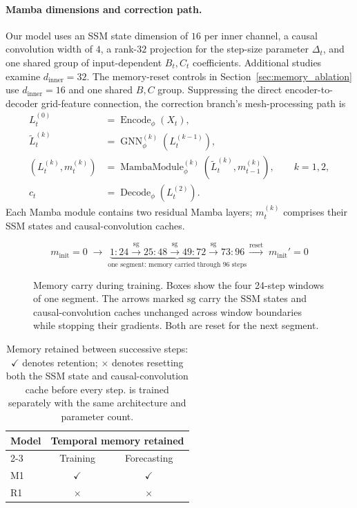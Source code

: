 \documentclass{article}
\newcommand{\vfourchange}[1]{{\color{blue}#1}}
\newcommand{\vfourred}[1]{{\color{red}#1}}
\newif\ifvfivechanges
\newcommand{\vfiveidentity}[1]{#1}
\DeclareRobustCommand{\vfiveadded}[1]{\ifvfivechanges{\color{vfiveAdded}%
  \let\vfourchange\vfiveidentity\let\vfourred\vfiveidentity#1}\else{\color{blue}%
  \let\vfourchange\vfiveidentity\let\vfourred\vfiveidentity#1}\fi}
\DeclareRobustCommand{\vfiveRone}[1]{\ifvfivechanges{\color{vfiveDeleted}\sout{#1}}\,\fi\vfiveadded{R1}}
\begin{document}
\paragraph{Mamba dimensions and correction path.}
\vfiveadded{Our model uses an SSM state dimension of $16$ per inner channel, a causal convolution width of $4$, a rank-$32$ projection for the step-size parameter $\Delta_t$, and one shared group of input-dependent $B_t,C_t$ coefficients. Additional studies examine $d_{\mathrm{inner}}=32$. The memory-reset controls in Section~\ref{sec:memory_ablation} use $d_{\mathrm{inner}}=16$ and one shared $B,C$ group.}
\vfiveadded{Suppressing the direct encoder-to-decoder grid-feature connection, the correction branch's mesh-processing path is}
\begin{align}
    L_t^{(0)} &= \operatorname{Encode}_\phi(X_t),\\
    \widetilde{L}_t^{(k)} &= \operatorname{GNN}^{(k)}_\phi(L_t^{(k-1)}),\\
    (L_t^{(k)},m_t^{(k)})
    &=\operatorname{MambaModule}^{(k)}_\phi
       (\widetilde{L}_t^{(k)},m_{t-1}^{(k)}),\qquad k=1,2,\\
    c_t &= \operatorname{Decode}_\phi(L_t^{(2)}).
\end{align}
\vfiveadded{Each Mamba module contains two residual Mamba layers; $m_t^{(k)}$ comprises their SSM states and causal-convolution caches.}

\begin{figure}[!htbp]
    \centering
    \normalsize
    \[
    m_{\mathrm{init}}=0\;\longrightarrow\;
    \underbrace{
      \boxed{1{:}24}
      \xrightarrow{\mathrm{sg}}\boxed{25{:}48}
      \xrightarrow{\mathrm{sg}}\boxed{49{:}72}
      \xrightarrow{\mathrm{sg}}\boxed{73{:}96}
    }_{\text{one segment: memory carried through 96 steps}}
    \xrightarrow{\mathrm{reset}}\;m_{\mathrm{init}}'=0
    \]
    \caption{Memory carry during training. Boxes show the four 24-step windows of one segment. The arrows marked $\mathrm{sg}$ carry the SSM states and causal-convolution caches unchanged across window boundaries while stopping their gradients. Both are reset for the next segment.}
    \label{fig:training_segments}
\end{figure}

\begin{table}[!htb]
    \centering
    \small
    \begin{tabular}{lcc}
        \toprule
        \vfourchange{Model} & \multicolumn{2}{c}{Temporal memory retained} \\
        \cmidrule(lr){2-3}
        & Training & Forecasting \\
        \midrule
        \vfourchange{M1} & $\checkmark$ & $\checkmark$ \\
        \vfiveRone{Reset/reset} & $\times$ & $\times$ \\
        \bottomrule
    \end{tabular}
    \caption{Memory retained between successive steps: $\checkmark$ denotes retention; $\times$ denotes resetting both the SSM state and causal-convolution cache before every step. \vfiveRone{Reset/reset} is trained separately with the same architecture and parameter count.}
    \label{tab:memory_controls}
\end{table}
\end{document}

